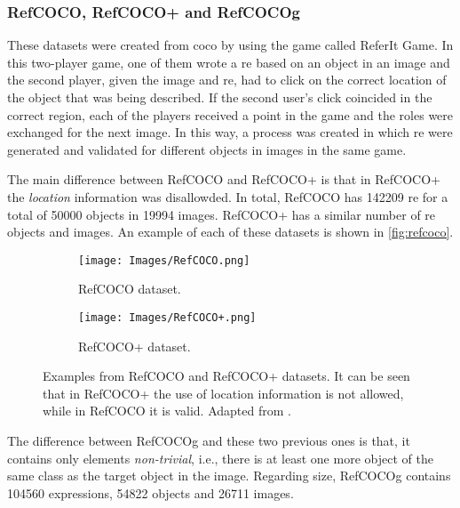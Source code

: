 \subsubsection{RefCOCO, RefCOCO+ and RefCOCOg}

These datasets were created from \gls{coco} by 
using the game called ReferIt Game. In this two-player game, one of them wrote
a \gls{re} based on an object in an image and the second player, given the
image and \gls{re}, had to click on the correct location of the object that was
being described. If the second user's click coincided in the correct region,
each of the players received a point in the game and the roles were exchanged
for the next image. In this way, a process was created in which \gls{re} were
generated and validated for different objects in images in the same game.

The main difference between RefCOCO and RefCOCO+ is that in RefCOCO+ the
\emph{location} information was disallowded. In total, RefCOCO has \num{142209}
\gls{re} for a total of \num{50000} objects in \num{19994} images. RefCOCO+ has
a similar number of \gls{re} objects and images. An example of each of these
datasets is shown in \vref{fig:refcoco}.

\begin{figure}[ht]
  \centering
  \begin{subfigure}[t]{.45\textwidth}
    \centering
    \caption{RefCOCO dataset.}
    \texttt{[image: Images/RefCOCO.png]}
  \end{subfigure}
  \begin{subfigure}[t]{.45\textwidth}
    \centering
    \caption{RefCOCO+ dataset.}
    \texttt{[image: Images/RefCOCO+.png]}
  \end{subfigure}
  \caption[Examples from RefCOCO and RefCOCO+ datasets]{Examples from RefCOCO
    and RefCOCO+ datasets. It can be seen that in RefCOCO+ the use of location
    information is not allowed, while in RefCOCO it is valid. Adapted from
    .}\label{fig:refcoco}
\end{figure}

The difference between RefCOCOg and these two previous ones is that, it
contains only elements \emph{non-trivial}, i.e., there is at least one more
object of the same class as the target object in the image. Regarding size,
RefCOCOg contains \num{104560} expressions, \num{54822} objects and \num{26711}
images.

